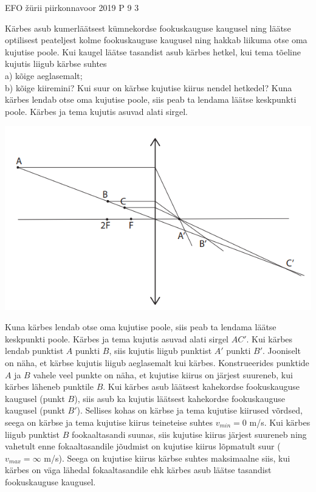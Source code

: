 {EFO žürii} %
{piirkonnavoor} %
{2019} %
{P 9} %
{3} %
{
\ifStatement
Kärbes asub kumerläätsest kümnekordse fookuskauguse kaugusel ning läätse optilisest peateljest kolme fookuskauguse kaugusel ning hakkab liikuma otse oma kujutise poole. Kui kaugel läätse tasandist asub kärbes hetkel, kui tema tõeline kujutis liigub kärbse suhtes \\
a) kõige aeglasemalt; \\
b) kõige kiiremini? Kui suur on kärbse kujutise kiirus nendel hetkedel?
\fi
\ifHint
Kuna kärbes lendab otse oma kujutise poole, siis peab ta lendama läätse keskpunkti poole. Kärbes ja tema kujutis asuvad alati sirgel.
\fi
\ifSolution
\begin{center}
	\includegraphics[width=0.5\linewidth]{2019-v2p-09-lah.PNG}
\end{center}
Kuna kärbes lendab otse oma kujutise poole, siis peab ta lendama läätse keskpunkti poole. Kärbes ja tema kujutis asuvad alati sirgel $AC'$. Kui kärbes lendab punktist $A$ punkti $B$, siis kujutis liigub punktist $A'$ punkti $B'$. Jooniselt on näha, et kärbse kujutis liigub aeglasemalt kui kärbes. Konstrueerides punktide $A$ ja $B$ vahele veel punkte on näha, et kujutise kiirus on järjest suureneb, kui kärbes läheneb punktile $B$. Kui kärbes asub läätsest kahekordse fookuskauguse kaugusel (punkt $B$), siis asub ka kujutis läätsest kahekordse fookuskauguse kaugusel (punkt $B'$). Sellises kohas on kärbse ja tema kujutise kiirused võrdsed, seega on kärbse ja tema kujutise kiirus teineteise suhtes $v_{min} = 0$ m/s. Kui kärbes liigub punktist $B$ fookaaltasandi suunas, siis kujutise kiirus järjest suureneb ning vahetult enne fokaaltasandile jõudmist on kujutise kiirus lõpmatult suur ($v_{max} = \infty$ m/s). Seega on kujutise kiirus kärbse suhtes maksimaalne siis, kui kärbes on väga lähedal fokaaltasandile ehk kärbes asub läätse tasandist fookuskauguse kaugusel.
\fi
}
